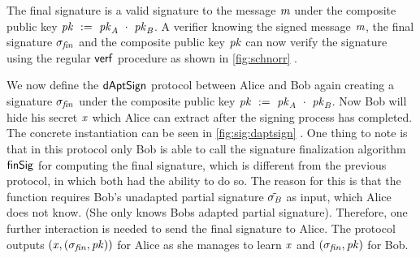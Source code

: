 The final signature is a valid signature to the message $\mathit{m}$ under the composite public key $\mathit{pk} ~:=~ \mathit{pk}_{\mathit{A}} ~\cdot~ \mathit{pk}_{\mathit{B}}$.
A verifier knowing the signed message $\mathit{m}$, the final signature $\sigma_{\mathit{fin}}$ and the composite public key $\mathit{pk}$ can now verify the signature using the regular $\mathsf{verf}$ procedure as shown in \cref{fig:schnorr} .

We now define the $\mathsf{dAptSign}$ protocol between Alice and Bob again creating a signature $\sigma_{\mathit{fin}}$ under the composite public key $\mathit{pk} ~:=~ \mathit{pk}_{\mathit{A}} ~\cdot~ \mathit{pk}_{\mathit{B}}$.
Now Bob will hide his secret $\mathit{x}$ which Alice can extract after the signing process has completed.
The concrete instantiation can be seen in \cref{fig:sig:daptsign} .
One thing to note is that in this protocol only Bob is able to call the signature finalization algorithm $\mathsf{finSig}$ for computing the final signature, which is different from the previous protocol, in which both had the ability to do so.
The reason for this is that the function requires Bob's unadapted partial signature $\tilde{\sigma_{\mathit{B}}}$ as input, which Alice does not know. (She only knows Bobs adapted partial signature).
Therefore, one further interaction is needed to send the final signature to Alice.
The protocol outputs $(\mathit{x}, (\sigma_{\mathit{fin}}, \mathit{pk}))$ for Alice as she manages to learn $\mathit{x}$ and $(\sigma_{\mathit{fin}}, \mathit{pk})$ for Bob.


